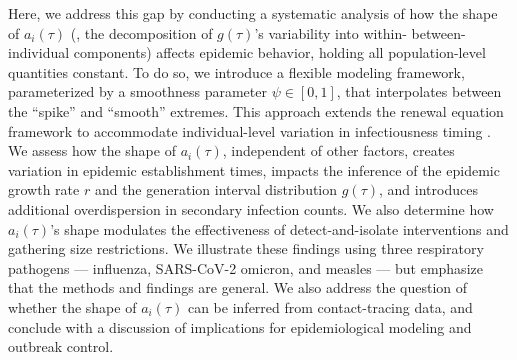 Here, we address this gap by conducting a systematic analysis of how the shape of $a_i(\tau)$ (\ie, the decomposition of $g(\tau)$'s variability into within- \vs between-individual components) affects epidemic behavior, holding all population-level quantities constant. To do so, we introduce a flexible modeling framework, parameterized by a smoothness parameter $\psi \in [0,1]$, that interpolates between the ``spike'' and ``smooth'' extremes. This approach extends the renewal equation framework to accommodate individual-level variation in infectiousness timing \citep{breda_formulation_2012}. We assess how the shape of $a_i(\tau)$, independent of other factors, creates variation in epidemic establishment times, impacts the inference of the epidemic growth rate $r$ and the generation interval distribution $g(\tau)$, and introduces additional overdispersion in secondary infection counts. We also determine how $a_i(\tau)$'s shape modulates the effectiveness of detect-and-isolate interventions and gathering size restrictions. We illustrate these findings using three respiratory pathogens --- influenza, SARS-CoV-2 omicron, and measles --- but emphasize that the methods and findings are general. We also address the question of whether the shape of $a_i(\tau)$ can be inferred from contact-tracing data, and conclude with a discussion of implications for epidemiological modeling and outbreak control. 



